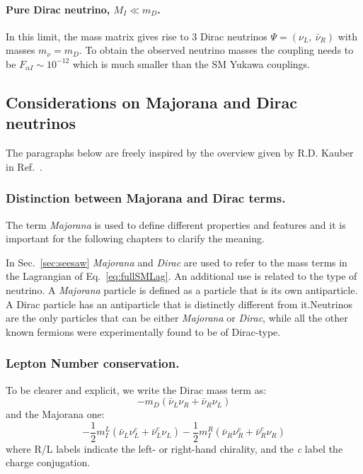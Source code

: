 \paragraph {Pure Dirac neutrino, $M_I \ll m_D$.}
In this limit, the mass matrix gives rise to 3 Dirac neutrinos $\Psi = (\nu_L,\:\bar{\nu}_R)$ with masses $m_\nu = m_D$. To obtain the observed neutrino masses the coupling needs to be $F_{\alpha I} \sim 10^{-12}$ which is much smaller than the SM Yukawa couplings.

\subsection{Considerations on Majorana and Dirac neutrinos}\label{sec:c3majo_dirac}
The paragraphs below are freely inspired by the overview given by
R.D. Kauber in Ref.~\cite{webpage_seesaw}.
\subsubsection {Distinction between Majorana and Dirac terms.}\label{sec:majo_dirac}
The term \emph{Majorana} is used to define different properties and features and it is important for the following chapters to clarify the meaning.

In Sec.~\ref{sec:seesaw} \emph{Majorana} and \emph{Dirac} are used to
refer to the mass terms in the Lagrangian of Eq.~\ref{eq:fullSMLag}. An additional use is related to the type of neutrino. A \emph{Majorana} particle is defined as a particle that is its own antiparticle.  A Dirac particle has an antiparticle that is distinctly different from it.Neutrinos are the only particles that can be either \emph{Majorana} or \emph{Dirac}, while all the other known fermions were experimentally found to be of Dirac-type.

\subsubsection{Lepton Number conservation.}\label{sec:lnv_lnc}
To be clearer and explicit, we write the Dirac mass term as:
\begin{equation}
\label{eq:dirac}
-m_D (\bar{\nu}_L\nu_R + \bar{\nu}_R\nu_L)
\end{equation}
and the Majorana one:
\begin{equation}
\label{eq:majorana}
-\frac{1}{2}m^{L}_{I}(\bar{\nu}_L\nu^{c}_L + \bar{\nu}_L^{c}\nu_L) -\frac{1}{2}m^{R}_{I} (\bar{\nu}_R\nu^{c}_R + \bar{\nu}_R^{c}\nu_R)
\end{equation}
where R/L labels indicate the left- or right-hand chirality, and the
\emph{c} label the charge conjugation.

